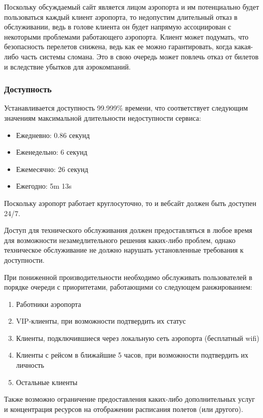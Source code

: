 
Поскольку обсуждаемый сайт является лицом 
аэропорта и им потенциально будет пользоваться
каждый клиент аэропорта, то недопустим
длительный отказ в обслуживании, ведь
в голове клиента он будет напрямую ассоциирован
с некоторыми проблемами работающего аэропорта.
Клиент может подумать, что безопасность перелетов
снижена, ведь как ее можно гарантировать, когда
какая-либо часть системы сломана. Это в свою очередь
может повлечь отказ от билетов и вследствие 
убытков для аэрокомпаний.

\subsubsection{Доступность}

Устанавливается доступность 99.999\% времени,
что соответствует следующим значениям максимальной 
длительности недоступности сервиса: 
\begin{itemize}
  \item Ежедневно:   0.86 секунд
  \item Еженедельно: 6 секунд
  \item Ежемесячно:  26 секунд
  \item Ежегодно:    5m 13s
\end{itemize}

Поскольку аэропорт работает круглосуточно, то 
и вебсайт должен быть доступен 24/7.

Доступ для технического обслуживания должен
предоставляться в любое время для возможности
незамедлительного решения каких-либо проблем,
однако техническое обслуживание не должно 
нарушать установленные требования к доступности.

При пониженной производительности необходимо 
обслуживать пользователей в порядке очереди
с приоритетами, работающими со следующем 
ранжированием:
\begin{enumerate}
  \item Работники аэропорта
  \item VIP-клиенты, при возможности 
        подтвердить их статус
  \item Клиенты, подключившиеся через 
        локальную сеть аэропорта (бесплатный wifi)
  \item Клиенты с рейсом в ближайшие 5 часов, 
        при возможности подтвердить их личность
  \item Остальные клиенты
\end{enumerate}

Также возможно ограничение предоставления каких-либо
дополнительных услуг и концентрация ресурсов на 
отображении расписания полетов (или другого).

